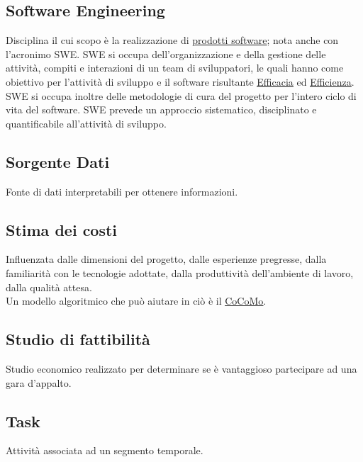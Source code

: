 	\subsection{Software Engineering}
	\label{sec:swe}
	Disciplina il cui scopo è la realizzazione di  \underline{\hyperref[sec:prodottosoftware]{prodotti software}}; nota anche con l'acronimo SWE.
	SWE si occupa dell'organizzazione e della gestione delle attività, compiti e interazioni di un team di sviluppatori,
	le quali hanno come obiettivo per l'attività di sviluppo e il software risultante \underline{\hyperref[sec:efficacia]{Efficacia}} ed \underline{\hyperref[sec:efficienza]{Efficienza}}.
	SWE si occupa inoltre delle metodologie di cura del progetto per l'intero ciclo di vita del software.
	SWE prevede un approccio sistematico, disciplinato e quantificabile all'attività di sviluppo.


	\subsection{Sorgente Dati}
	\label{sec:sorgentedati}
	Fonte di dati interpretabili per ottenere informazioni.
	
	
	\subsection{Stima dei costi}
	\label{sec:stimacosti}
	Influenzata dalle dimensioni del progetto, dalle esperienze pregresse, dalla familiarità con le tecnologie adottate, dalla produttività dell'ambiente di lavoro, dalla qualità attesa. \\Un modello algoritmico che può aiutare in ciò è il \underline{\hyperref[sec:cocomo]{CoCoMo}}.

	
	\subsection{Studio di fattibilità}
	\label{sec:studiofattibilita}
	Studio economico realizzato per determinare se è vantaggioso partecipare ad una gara d'appalto.
	
	
	\newpage
	
	
	\subsection{Task}
	\label{sec:task}
	Attività associata ad un segmento temporale.
		

